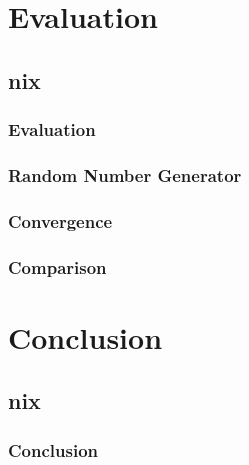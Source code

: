 \documentclass[%
14pt
]{beamer}
\begin{document}




\section{Evaluation}
\subsection{nix}
\begin{frame}
  \frametitle{Evaluation}
\end{frame}

\begin{frame}
  \frametitle{Random Number Generator}
\end{frame}

\begin{frame}
  \frametitle{Convergence}
\end{frame}

\begin{frame}
  \frametitle{Comparison}
\end{frame}

\section{Conclusion}
\subsection{nix}
\begin{frame}
  \frametitle{Conclusion}
\end{frame}


\end{document}
